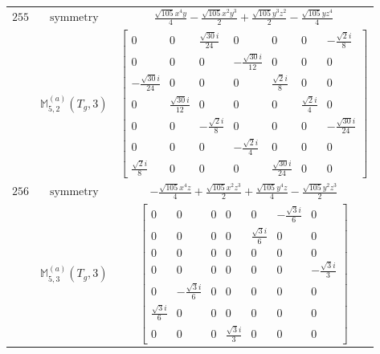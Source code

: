 \documentclass[fleqn,8pt,landscape]{jsarticle}
\begin{document}
\begin{longtable}{ccc}
$ 255 $ & $ \text{symmetry} $ & $ \frac{\sqrt{105} x^{4} y}{4} - \frac{\sqrt{105} x^{2} y^{3}}{2} + \frac{\sqrt{105} y^{3} z^{2}}{2} - \frac{\sqrt{105} y z^{4}}{4} $ \\
$  $ & $ \mathbb{M}_{5,2}^{(a)}(T_{g},3) $ & $ \begin{bmatrix} 0 & 0 & \frac{\sqrt{30} i}{24} & 0 & 0 & 0 & - \frac{\sqrt{2} i}{8} \\ 0 & 0 & 0 & - \frac{\sqrt{30} i}{12} & 0 & 0 & 0 \\ - \frac{\sqrt{30} i}{24} & 0 & 0 & 0 & \frac{\sqrt{2} i}{8} & 0 & 0 \\ 0 & \frac{\sqrt{30} i}{12} & 0 & 0 & 0 & \frac{\sqrt{2} i}{4} & 0 \\ 0 & 0 & - \frac{\sqrt{2} i}{8} & 0 & 0 & 0 & - \frac{\sqrt{30} i}{24} \\ 0 & 0 & 0 & - \frac{\sqrt{2} i}{4} & 0 & 0 & 0 \\ \frac{\sqrt{2} i}{8} & 0 & 0 & 0 & \frac{\sqrt{30} i}{24} & 0 & 0 \end{bmatrix} $ \\ \hline
$ 256 $ & $ \text{symmetry} $ & $ - \frac{\sqrt{105} x^{4} z}{4} + \frac{\sqrt{105} x^{2} z^{3}}{2} + \frac{\sqrt{105} y^{4} z}{4} - \frac{\sqrt{105} y^{2} z^{3}}{2} $ \\
$  $ & $ \mathbb{M}_{5,3}^{(a)}(T_{g},3) $ & $ \begin{bmatrix} 0 & 0 & 0 & 0 & 0 & - \frac{\sqrt{3} i}{6} & 0 \\ 0 & 0 & 0 & 0 & \frac{\sqrt{3} i}{6} & 0 & 0 \\ 0 & 0 & 0 & 0 & 0 & 0 & 0 \\ 0 & 0 & 0 & 0 & 0 & 0 & - \frac{\sqrt{3} i}{3} \\ 0 & - \frac{\sqrt{3} i}{6} & 0 & 0 & 0 & 0 & 0 \\ \frac{\sqrt{3} i}{6} & 0 & 0 & 0 & 0 & 0 & 0 \\ 0 & 0 & 0 & \frac{\sqrt{3} i}{3} & 0 & 0 & 0 \end{bmatrix} $ \\ \hline
\end{longtable}
\end{document}
